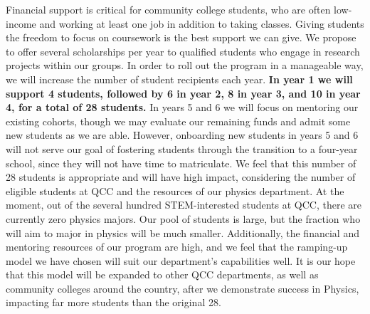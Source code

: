 \documentclass[12pt]{article}
\newcommand\new[1]{{\color{blue}#1}}
\begin{document}



Financial support is critical for community college students, who are often low-income and working at least one job in addition to taking classes.  Giving students the freedom to focus on coursework is the best support we can give.  We propose to offer several scholarships per year to qualified students who engage in research projects within our groups.  In order to roll out the program in a manageable way, we will increase the number of student recipients each year.  {\bf In year 1 we will support 4 students, followed by 6 in year 2, 8 in year 3, and 10 in year 4, for a total of 28 students.}  \new{In years 5 and 6 we will focus on mentoring our existing cohorts, though we may evaluate our remaining funds and admit some new students as we are able.  However, onboarding new students in years 5 and 6 
will not serve our goal of fostering students through the transition to a four-year school, since they will not have time to matriculate.  We feel that this number of 28 students is appropriate and will have high impact, considering the number of eligible students at QCC and the resources of our physics department.  At the moment,} out of the several hundred STEM-interested students at QCC, there are currently zero physics majors.  Our pool of students is large, but the fraction who will aim to major in physics will be much smaller.  Additionally, the financial and mentoring resources of our program are high, and we feel that the ramping-up model we have chosen will suit our department's capabilities well.  It is our hope that this model will be expanded to other QCC departments, as well as community colleges around the country, after we demonstrate success in Physics\new{, impacting far more students than the original 28}.  
\end{document}
